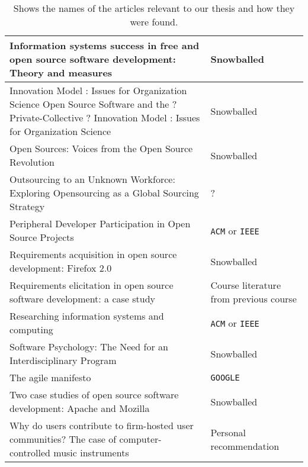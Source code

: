 \documentclass[11pt, oneside]{article}   	%
\begin{document}
\begin{table}[!h]
\begin{tabular}{  p{}  p{} }
		Information systems success in free and open source software development: Theory and measures	& Snowballed	\\\hline
		Innovation Model : Issues for Organization Science Open Source Software and the ? Private-Collective ? Innovation Model : Issues for Organization Science	& Snowballed	\\\hline
		Open Sources: Voices from the Open Source Revolution	& Snowballed	\\\hline
		Outsourcing to an Unknown Workforce: Exploring Opensourcing as a Global Sourcing Strategy	& ?	\\\hline
		Peripheral Developer Participation in Open Source Projects	& \texttt{ACM} or \texttt{IEEE}	\\\hline
		Requirements acquisition in open source development: Firefox 2.0	& Snowballed	\\\hline
		Requirements elicitation in open source software development: a case study	& Course literature from previous course	\\\hline
		Researching information systems and computing	& \texttt{ACM} or \texttt{IEEE}	\\\hline
		Software Psychology: The Need for an Interdisciplinary Program	& Snowballed	\\\hline
		The agile manifesto	& \texttt{GOOGLE}	\\\hline
		Two case studies of open source software development: Apache and Mozilla	& Snowballed	\\\hline
		Why do users contribute to firm-hosted user communities? The case of computer-controlled music instruments	& Personal recommendation	\\\hline
	\end{tabular}
	\caption{Shows the names of the articles relevant to our thesis and how they were found.}
	\label{tab:relevant}
\end{table}
\end{document}
